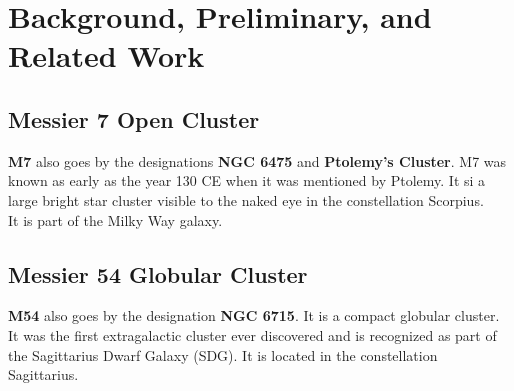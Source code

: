 \documentclass[12pt, twocolumn]{aastex62}
\begin{document}
	
	\section{Background, Preliminary, and Related Work}
	
		\subsection{Messier 7 Open Cluster}
		\textbf{M7} also goes by the designations \textbf{NGC 6475} and \textbf{Ptolemy's Cluster}. M7 was known as early as the year 130 CE when it was mentioned by Ptolemy. It si a large bright star cluster visible to the naked eye in the constellation Scorpius.\\
		It is part of the Milky Way galaxy.
		
		\subsection{Messier 54 Globular Cluster}
		\textbf{M54} also goes by the designation \textbf{NGC 6715}. It is a compact globular cluster.\\
		It was the first extragalactic cluster ever discovered and is recognized as part of the Sagittarius Dwarf Galaxy (SDG). It is located in the constellation Sagittarius.
	
	
	
	
\end{document}
